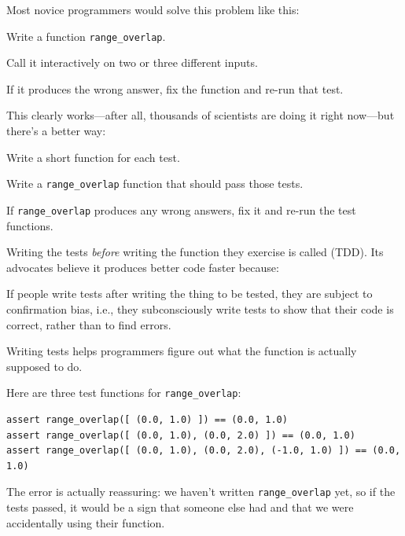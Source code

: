 \documentclass{book}
\begin{document}
Most novice programmers would solve this problem like this:

\begin{swcenumerate}
\item
  Write a function \texttt{range\_overlap}.
\item
  Call it interactively on two or three different inputs.
\item
  If it produces the wrong answer, fix the function and re-run that
  test.
\end{swcenumerate}

This clearly works---after all, thousands of scientists are doing it
right now---but there's a better way:

\begin{swcenumerate}
\item
  Write a short function for each test.
\item
  Write a \texttt{range\_overlap} function that should pass those tests.
\item
  If \texttt{range\_overlap} produces any wrong answers, fix it and
  re-run the test functions.
\end{swcenumerate}

Writing the tests \emph{before} writing the function they exercise is
called 
(TDD). Its advocates believe it produces better code faster because:

\begin{swcenumerate}
\item
  If people write tests after writing the thing to be tested, they are
  subject to confirmation bias, i.e., they subconsciously write tests to
  show that their code is correct, rather than to find errors.
\item
  Writing tests helps programmers figure out what the function is
  actually supposed to do.
\end{swcenumerate}

Here are three test functions for \texttt{range\_overlap}:

\begin{verbatim}
assert range_overlap([ (0.0, 1.0) ]) == (0.0, 1.0)
assert range_overlap([ (0.0, 1.0), (0.0, 2.0) ]) == (0.0, 1.0)
assert range_overlap([ (0.0, 1.0), (0.0, 2.0), (-1.0, 1.0) ]) == (0.0, 1.0)
\end{verbatim}

The error is actually reassuring: we haven't written
\texttt{range\_overlap} yet, so if the tests passed, it would be a sign
that someone else had and that we were accidentally using their
function.
\end{document}
